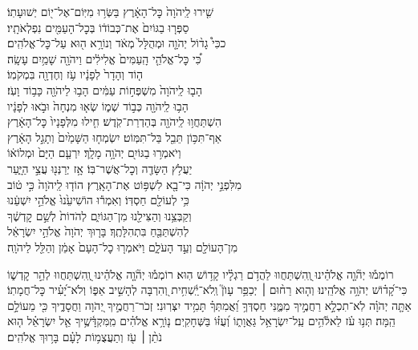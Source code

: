 \documentclass[twoside, openany, parskip=half, 11pt]{book}
\begin{document}
\begin{narrow}
שִׁ֤ירוּ לַֽיהֹוָה֙ כׇּל־הָאָ֔רֶץ \hfill בַּשְּׂר֥וּ מִיּֽוֹם־אֶל־י֖וֹם יְשׁוּעָתֽוֹ׃\\
סַפְּר֤וּ בַגּוֹיִם֙ אֶת־כְּבוֹד֔וֹ \hfill בְּכׇל־הָעַמִּ֖ים נִפְלְאֹתָֽיו׃\\
ככִּי֩ גָד֨וֹל יְהֹוָ֤ה וּמְהֻלָּל֙ מְאֹ֔ד \hfill וְנוֹרָ֥א ה֖וּא עַל־כׇּל־אֱלֹהִֽים׃\\
כִּ֠י כׇּל־אֱלֹהֵ֤י הָֽעַמִּים֙ אֱלִילִ֔ים \hfill וַיהֹוָ֖ה שָׁמַ֥יִם עָשָֽׂה׃\\
ה֤וֹד וְהָדָר֙ לְפָנָ֔יו \hfill עֹ֥ז וְחֶדְוָ֖ה בִּמְקֹמֽוֹ׃\\
הָב֤וּ לַֽיהֹוָה֙ מִשְׁפְּח֣וֹת עַמִּ֔ים \hfill הָב֥וּ לַיהֹוָ֖ה כָּב֥וֹד וָעֹֽז׃\\
הָב֥וּ לַֽיהֹוָ֖ה כְּב֣וֹד שְׁמ֑וֹ \hfill שְׂא֤וּ מִנְחָה֙ וּבֹ֣אוּ לְפָנָ֔יו\\
הִשְׁתַּחֲו֥וּ לַֽיהֹוָ֖ה בְּהַדְרַת־קֹֽדֶשׁ׃	\hfill חִ֤ילוּ מִלְּפָנָיו֙ כׇּל־הָאָ֔רֶץ\\
אַף־תִּכּ֥וֹן תֵּבֵ֖ל בַּל־תִּמּֽוֹט׃ 	\hfill יִשְׂמְח֤וּ הַשָּׁמַ֙יִם֙ וְתָגֵ֣ל הָאָ֔רֶץ\\
וְיֹאמְר֥וּ בַגּוֹיִ֖ם יְהֹוָ֥ה מָלָֽךְ׃ \hfill יִרְעַ֤ם הַיָּם֙ וּמְלוֹא֔וֹ\\
יַעֲלֹ֥ץ הַשָּׂדֶ֖ה וְכׇל־אֲשֶׁר־בּֽוֹ׃ \hfill אָ֥ז יְרַנְּנ֖וּ עֲצֵ֣י הַיָּ֑עַר\\
מִלִּפְנֵ֣י יְהֹוָ֔ה כִּי־בָ֖א לִשְׁפּ֥וֹט אֶת־הָאָֽרֶץ׃ 	\hfill הוֹד֤וּ לַֽיהֹוָה֙ כִּ֣י ט֔וֹב\\
כִּ֥י לְעוֹלָ֖ם חַסְדּֽוֹ׃ \hfill וְאִמְר֕וּ הוֹשִׁיעֵ֙נוּ֙ אֱלֹהֵ֣י יִשְׁעֵ֔נוּ\\
וְקַבְּצֵ֥נוּ וְהַצִּילֵ֖נוּ מִן־הַגּוֹיִ֑ם \hfill לְהֹדוֹת֙ לְשֵׁ֣ם קׇדְשֶׁ֔ךָ\\
לְהִשְׁתַּבֵּ֖חַ בִּתְהִלָּתֶֽךָ׃ \hfill בָּר֤וּךְ יְהֹוָה֙ אֱלֹהֵ֣י יִשְׂרָאֵ֔ל\\
מִן־הָעוֹלָ֖ם וְעַ֣ד הָעֹלָ֑ם וַיֹּאמְר֤וּ כׇל־הָעָם֙ אָמֵ֔ן \hfill וְהַלֵּ֖ל לַיהֹוָֽה׃\\
\end{narrow}

\newcommand{\negline}{\vspace{-\baselineskip}}

\negline

%
רוֹמְמ֡וּ יְהֹ֘וָ֤ה אֱלֹהֵ֗ינוּ וְֽ֭הִשְׁתַּחֲווּ לַהֲדֹ֥ם רַגְלָ֗יו קָד֥וֹשׁ הֽוּא׃   \hfill \break
רוֹמְמ֡וּ יְהֹ֘וָ֤ה אֱלֹהֵ֗ינוּ וְֽ֭הִשְׁתַּחֲווּ לְהַ֣ר קׇדְשׁ֑וֹ כִּי־קָ֝ד֗וֹשׁ יְהֹוָ֥ה אֱלֹהֵֽינוּ׃   \hfill \break
{}%
וְה֤וּא רַח֨וּם ׀ יְכַפֵּ֥ר עָוֺן֮ וְֽלֹא־יַֽ֫שְׁחִ֥ית וְ֭הִרְבָּה לְהָשִׁ֣יב אַפּ֑וֹ   \hfill \break
 וְלֹא־יָ֝עִ֗יר כׇּל־חֲמָתֽוֹ׃  \hfill \break
{}%
אַתָּ֤ה יְהֹוָ֗ה לֹֽא־תִכְלָ֣א רַחֲמֶ֣יךָ מִמֶּ֑נִּי חַסְדְּךָ֥ וַ֝אֲמִתְּךָ֗ תָּמִ֥יד יִצְּרֽוּנִי׃   \hfill \break
{}זְכֹר־רַחֲמֶ֣יךָ יְ֭הֹוָה וַחֲסָדֶ֑יךָ כִּ֖י מֵעוֹלָ֣ם הֵֽמָּה׃   \hfill \break
{}תְּנ֥וּ עֹ֗ז לֵאלֹ֫הִ֥ים עַֽל־יִשְׂרָאֵ֥ל גַּאֲוָת֑וֹ וְ֝עֻזּ֗וֹ בַּשְּׁחָקִֽים׃  \hfill \break
נ֤וֹרָ֥א אֱלֹהִ֗ים מִֽמִּקְדָּ֫שֶׁ֥יךָ אֵ֤ל יִשְׂרָאֵ֗ל  \hfill \break
ה֤וּא נֹתֵ֨ן ׀ עֹ֖ז וְתַעֲצֻמ֥וֹת לָעָ֗ם בָּר֥וּךְ אֱלֹהִֽים׃  \hfill \break
\end{document}

